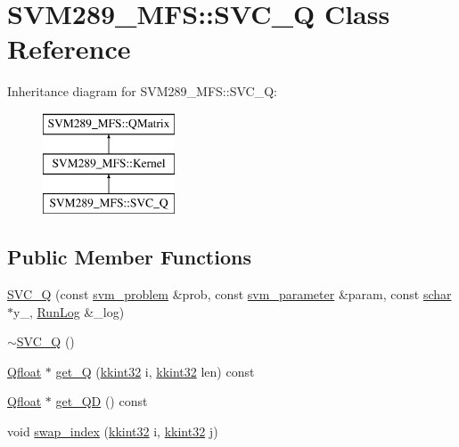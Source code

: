 \hypertarget{class_s_v_m289___m_f_s_1_1_s_v_c___q}{}\section{S\+V\+M289\+\_\+\+M\+FS\+:\+:S\+V\+C\+\_\+Q Class Reference}
\label{class_s_v_m289___m_f_s_1_1_s_v_c___q}
Inheritance diagram for S\+V\+M289\+\_\+\+M\+FS\+:\+:S\+V\+C\+\_\+Q\+:\begin{figure}[H]
\begin{center}
\leavevmode
\includegraphics[height=3.000000cm]{class_s_v_m289___m_f_s_1_1_s_v_c___q}
\end{center}
\end{figure}
\subsection*{Public Member Functions}
\begin{DoxyCompactItemize}
\item 
\hyperlink{class_s_v_m289___m_f_s_1_1_s_v_c___q_ab4ee67eb73ad55d5cdebc703f8058a6b}{S\+V\+C\+\_\+Q} (const \hyperlink{struct_s_v_m289___m_f_s_1_1svm__problem}{svm\+\_\+problem} \&prob, const \hyperlink{struct_s_v_m289___m_f_s_1_1svm__parameter}{svm\+\_\+parameter} \&param, const \hyperlink{namespace_s_v_m289___m_f_s_a27545e8471784d831870feacd3e831ff}{schar} $\ast$y\+\_\+, \hyperlink{class_k_k_b_1_1_run_log}{Run\+Log} \&\+\_\+log)
\item 
\hyperlink{class_s_v_m289___m_f_s_1_1_s_v_c___q_aad938da4045cf87a89babdd43b064f22}{$\sim$\+S\+V\+C\+\_\+Q} ()
\item 
\hyperlink{namespace_s_v_m289___m_f_s_a440663a1b8d42bc10329401883645ae1}{Qfloat} $\ast$ \hyperlink{class_s_v_m289___m_f_s_1_1_s_v_c___q_a00a74c7789d7a9a1fb9b0f1a370f999c}{get\+\_\+Q} (\hyperlink{namespace_k_k_b_a8fa4952cc84fda1de4bec1fbdd8d5b1b}{kkint32} i, \hyperlink{namespace_k_k_b_a8fa4952cc84fda1de4bec1fbdd8d5b1b}{kkint32} len) const 
\item 
\hyperlink{namespace_s_v_m289___m_f_s_a440663a1b8d42bc10329401883645ae1}{Qfloat} $\ast$ \hyperlink{class_s_v_m289___m_f_s_1_1_s_v_c___q_ad60b9479929999873edb3af53f830446}{get\+\_\+\+QD} () const 
\item 
void \hyperlink{class_s_v_m289___m_f_s_1_1_s_v_c___q_a62219b7dbada662e0988f9e900ac5653}{swap\+\_\+index} (\hyperlink{namespace_k_k_b_a8fa4952cc84fda1de4bec1fbdd8d5b1b}{kkint32} i, \hyperlink{namespace_k_k_b_a8fa4952cc84fda1de4bec1fbdd8d5b1b}{kkint32} j)
\end{DoxyCompactItemize}
